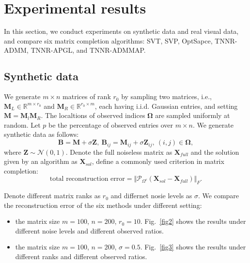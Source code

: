 \documentclass{article}
\begin{document}
{\section{Experimental results}
\label{s4}

In this section, we conduct experiments on synthetic data and real visual data, and compare six matrix completion algorithms: SVT, SVP, OptSapce, TNNR-ADMM, TNNR-APGL, and TNNR-ADMMAP.

\subsection{Synthetic data}
We generate $m \times n$ matrices of rank $r_0$ by sampling two matrices, i.e., $\mathbf M_L \in \mathbb{R}^{m \times r_0} $ and $\mathbf M_R \in \mathbb{R}^{r_0 \times m} $, each having i.i.d. Gaussian entries, and setting $\mathbf M=\mathbf M_l \mathbf M_R$. The localtions of observed indices $\mathbf \Omega$ are sampled uniformly at random. Let $p$ be the  percentage of observed entries over $m \times n$. We generate synthetic data as follows:
\begin{equation*}
    \mathbf B = \mathbf M+ \sigma \mathbf Z, \ \mathbf B_{ij} = \mathbf M_{ij} + \sigma \mathbf Z_{ij}, \ (i,j) \in \mathbf \Omega,
\end{equation*}
where $\mathbf Z \sim \mathcal{N} (0,1)$. Denote the full noiseless matrix as $\mathbf X_{full}$ and the solution given by an algorithm as $\mathbf X_{sol}$, define a commonly used criterion in matrix completion:
\begin{equation*}
    \text{total reconstruction error} = \Vert \mathcal{P}_{\Omega^c}(\mathbf X_{sol}-\mathbf X_{full})\Vert_F.
\end{equation*}

Denote different matrix ranks as $r_0$ and differnet nosie levels as $\sigma$.
We compare the reconstruction error of the six methods under different setting:
\begin{itemize}
    \item  the matrix size $m =100$, $n=200$, $r_0 = 10$. Fig.~\ref{fig2} shows the results under different noise levels and different observed ratios.
    \item  the matrix size $m =100$, $n=200$, $\sigma = 0.5$. Fig.~\ref{fig3} shows the results under different ranks and different observed ratios.
\end{itemize}

}
\end{document}
